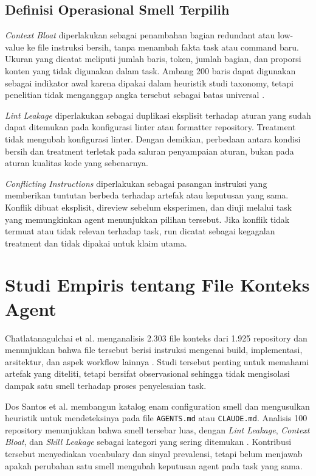 \subsection{Definisi Operasional Smell Terpilih}

\textit{Context Bloat} diperlakukan sebagai penambahan bagian redundant atau low-value ke file instruksi bersih, tanpa menambah fakta task atau command baru. Ukuran yang dicatat meliputi jumlah baris, token, jumlah bagian, dan proporsi konten yang tidak digunakan dalam task. Ambang 200 baris dapat digunakan sebagai indikator awal karena dipakai dalam heuristik studi taxonomy, tetapi penelitian tidak menganggap angka tersebut sebagai batas universal \cite{configsmells2026}.

\textit{Lint Leakage} diperlakukan sebagai duplikasi eksplisit terhadap aturan yang sudah dapat ditemukan pada konfigurasi linter atau formatter repository. Treatment tidak mengubah konfigurasi linter. Dengan demikian, perbedaan antara kondisi bersih dan treatment terletak pada saluran penyampaian aturan, bukan pada aturan kualitas kode yang sebenarnya.

\textit{Conflicting Instructions} diperlakukan sebagai pasangan instruksi yang memberikan tuntutan berbeda terhadap artefak atau keputusan yang sama. Konflik dibuat eksplisit, direview sebelum eksperimen, dan diuji melalui task yang memungkinkan agent menunjukkan pilihan tersebut. Jika konflik tidak termuat atau tidak relevan terhadap task, run dicatat sebagai kegagalan treatment dan tidak dipakai untuk klaim utama.

\section{Studi Empiris tentang File Konteks Agent}

Chatlatanagulchai et al. menganalisis 2.303 file konteks dari 1.925 repository dan menunjukkan bahwa file tersebut berisi instruksi mengenai build, implementasi, arsitektur, dan aspek workflow lainnya \cite{agentreadmes2025}. Studi tersebut penting untuk memahami artefak yang diteliti, tetapi bersifat observasional sehingga tidak mengisolasi dampak satu smell terhadap proses penyelesaian task.

Dos Santos et al. membangun katalog enam configuration smell dan mengusulkan heuristik untuk mendeteksinya pada file \texttt{AGENTS.md} atau \texttt{CLAUDE.md}. Analisis 100 repository menunjukkan bahwa smell tersebar luas, dengan \textit{Lint Leakage}, \textit{Context Bloat}, dan \textit{Skill Leakage} sebagai kategori yang sering ditemukan \cite{configsmells2026}. Kontribusi tersebut menyediakan vocabulary dan sinyal prevalensi, tetapi belum menjawab apakah perubahan satu smell mengubah keputusan agent pada task yang sama.

